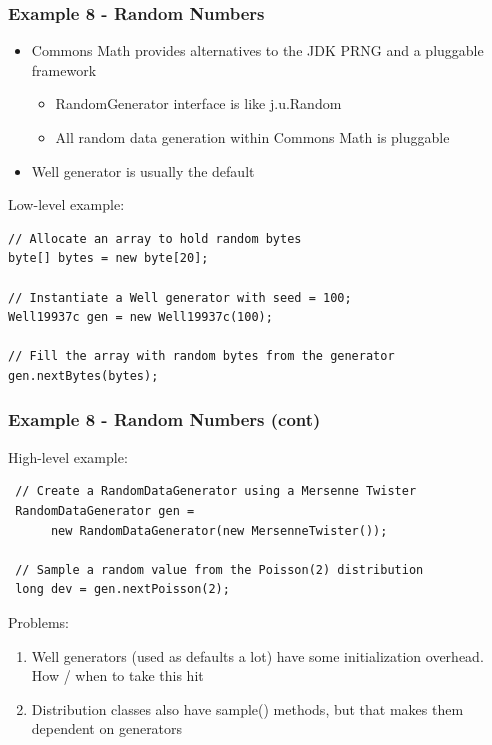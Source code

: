 \documentclass[14pt,mathserif]{beamer}
\begin{document}
\begin{frame}[fragile]
  \frametitle{Example 8 - Random Numbers}
  
\begin{small}
\begin{itemize}  
\item Commons Math provides alternatives to the JDK PRNG and a pluggable framework
\begin{itemize}
\item RandomGenerator interface is like j.u.Random
\item All random data generation within Commons Math is pluggable
\end {itemize}
\item Well generator is usually the default
\end{itemize}

Low-level example:

\begin{verbatim}
// Allocate an array to hold random bytes
byte[] bytes = new byte[20];

// Instantiate a Well generator with seed = 100;
Well19937c gen = new Well19937c(100);

// Fill the array with random bytes from the generator
gen.nextBytes(bytes);
\end{verbatim}
\end{small}
\end{frame}

\begin{frame}[fragile]
  \frametitle{Example 8 - Random Numbers (cont)}  
  
High-level example:

\begin{verbatim}
 // Create a RandomDataGenerator using a Mersenne Twister 
 RandomDataGenerator gen = 
      new RandomDataGenerator(new MersenneTwister());
      
 // Sample a random value from the Poisson(2) distribution
 long dev = gen.nextPoisson(2);
 \end{verbatim}

Problems:
\begin{small}
\begin{enumerate}
\item Well generators (used as defaults a lot) have some initialization overhead.
How / when to take this hit
\item Distribution classes also have sample() methods, but that makes them dependent on
generators
\end{enumerate}
\end{small}
\end{frame}
\end{document}
